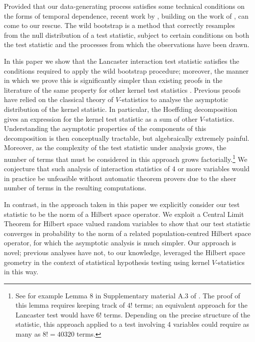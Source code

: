 \documentclass[]{article}
\begin{document}
Provided that our data-generating process satisfies some technical conditions on the forms of temporal dependence, recent work by \citet{leucht2013dependent}, building on the work of \citet{shao2010dependent}, can come to our rescue. The wild bootstrap is a method that correctly resamples from the null distribution of a test statistic, subject to certain conditions on both the test statistic and the processes from which the observations have been drawn.

In this paper we show that the Lancaster interaction test statistic satisfies the conditions required to apply the wild bootstrap procedure; moreover, the manner in which we prove this is significantly simpler than existing proofs in the literature of the same property for other kernel test statistics \citep{chwialkowski2014wild,chwialkowski2014kernel}. Previous proofs have relied on the classical theory of $V$-statistics to analyse the asymptotic distribution of the kernel statistic. In particular, the Hoeffding decomposition gives an expression for the kernel test statistic as a sum of other $V$-statistics. Understanding the asymptotic properties of the components of this decomposition is then conceptually tractable, but algebraically extremely painful. Moreover, as the complexity of the test statistic under analysis grows, the number of terms that must be considered in this approach grows factorially.\footnote{See for example Lemma 8 in Supplementary material A.3 of \citet{chwialkowski2014kernel}. The proof of this lemma requires keeping track of $4!$ terms; an equivalent approach for the Lancaster test would have $6!$ terms. Depending on the precise structure of the statistic, this approach applied to a test involving 4 variables could require as many as $8!=40320$ terms.} We conjecture that such analysis of interaction statistics of 4 or more variables would in practice be unfeasible without automatic theorem provers due to the sheer number of terms in the resulting computations.

In contrast, in the approach taken in this paper we explicitly consider our test statistic to be the norm of a Hilbert space operator. We exploit a Central Limit Theorem for Hilbert space valued random variables \cite{dehling2015bootstrap} to show that our test statistic converges in probability to the norm of a related population-centred Hilbert space operator, for which the asymptotic analysis is much simpler. Our approach is novel; previous analyses have not, to our knowledge, leveraged the Hilbert space geometry in the context of statistical hypothesis testing using kernel $V$-statistics in this way. 
\end{document}
